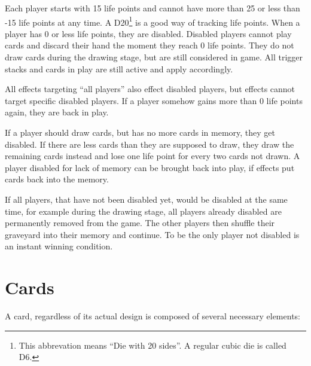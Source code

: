\documentclass[a4paper,10pt]{article}
\begin{document}
Each player starts with 15 life points and cannot have more than 25 or less than -15 life
points at any time. A D20\footnote{This abbrevation means ``Die with 20 sides''. A regular
cubic die is called D6.} is a good way of tracking life points. When a player has 0 or
less life points, they are disabled. Disabled players cannot play cards and discard their
hand the moment they reach 0 life points. They do not draw cards during the drawing stage,
but are still considered in game. All trigger stacks and cards in play are still active
and apply accordingly.

All effects targeting ``all players'' also effect disabled players, but effects cannot
target specific disabled players. If a player somehow gains more than 0 life points
again, they are back in play.

If a player should draw cards, but has no more cards in memory, they get disabled. If
there are less cards than they are supposed to draw, they draw the remaining cards instead
and lose one life point for every two cards not drawn. A player disabled for lack of
memory can be brought back into play, if effects put cards back into the memory.

If all players, that have not been disabled yet, would be disabled at the same time, for
example during the drawing stage, all players already disabled are permanently removed
from the game. The other players then shuffle their graveyard into their memory and
continue. To be the only player not disabled is an instant winning condition.

\section{Cards}

A card, regardless of its actual design is composed of several necessary elements:
\end{document}
